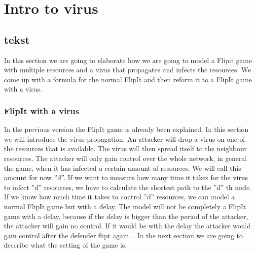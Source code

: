 \chapter{Intro to virus}
\label{cha:6}



\section{tekst}

In this section we are going to elaborate how we are going to model a Flipit game with multiple resources and a virus that propagates and infects the resources. We come up with a formula for the normal FlipIt and then reform it to a FlipIt game with a virus.

\subsection{FlipIt with a virus}
In the previous version the FlipIt game is already been explained. In this section we will introduce the virus propagation. An attacker will drop a virus on one of the resources that is available. The virus will then spread itself to the neighbour resources. The attacker will only gain control over the whole network, in general the game, when it has infected a certain amount of resources. We will call this amount for now ''d''. If we want to measure how many time it takes for the virus to infect ''d'' resources, we have to calculate the shortest path to the ''d'' th node.  If we know how much time it takes to control ''d'' resources, we can model a normal FlipIt game but with a delay. The model will not be completely a FlipIt game with a delay, because if the delay is bigger than the period of the attacker, the attacker will gain no control. If it would be with the delay the attacker would gain control after the defender flipt again. . In the next section we are going to describe what the setting of the game is.

